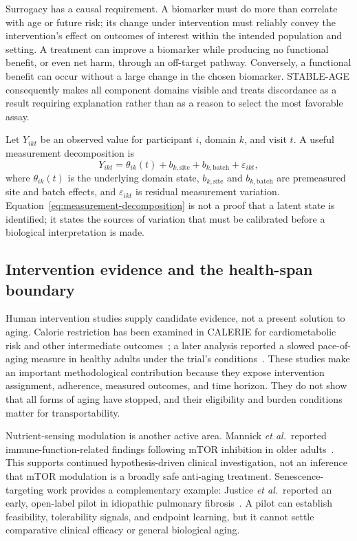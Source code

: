 \documentclass[10pt,conference]{IEEEtran}
\begin{document}
Surrogacy has a causal requirement. A biomarker must do more than correlate with age or future risk; its change under intervention must reliably convey the intervention's effect on outcomes of interest within the intended population and setting. A treatment can improve a biomarker while producing no functional benefit, or even net harm, through an off-target pathway. Conversely, a functional benefit can occur without a large change in the chosen biomarker. STABLE-AGE consequently makes all component domains visible and treats discordance as a result requiring explanation rather than as a reason to select the most favorable assay.

Let $Y_{ikt}$ be an observed value for participant $i$, domain $k$, and visit $t$. A useful measurement decomposition is
\begin{equation}
Y_{ikt}=\theta_{ik}(t)+b_{k,\mathrm{site}}+b_{k,\mathrm{batch}}+\varepsilon_{ikt},
\label{eq:measurement-decomposition}
\end{equation}
where $\theta_{ik}(t)$ is the underlying domain state, $b_{k,\mathrm{site}}$ and $b_{k,\mathrm{batch}}$ are premeasured site and batch effects, and $\varepsilon_{ikt}$ is residual measurement variation. Equation~\eqref{eq:measurement-decomposition} is not a proof that a latent state is identified; it states the sources of variation that must be calibrated before a biological interpretation is made.

\subsection{Intervention evidence and the health-span boundary}

Human intervention studies supply candidate evidence, not a present solution to aging. Calorie restriction has been examined in CALERIE for cardiometabolic risk and other intermediate outcomes~\cite{kraus2019}; a later analysis reported a slowed pace-of-aging measure in healthy adults under the trial's conditions~\cite{belsky2023}. These studies make an important methodological contribution because they expose intervention assignment, adherence, measured outcomes, and time horizon. They do not show that all forms of aging have stopped, and their eligibility and burden conditions matter for transportability.

Nutrient-sensing modulation is another active area. Mannick \emph{et al.}\ reported immune-function-related findings following mTOR inhibition in older adults~\cite{mannick2014}. This supports continued hypothesis-driven clinical investigation, not an inference that mTOR modulation is a broadly safe anti-aging treatment. Senescence-targeting work provides a complementary example: Justice \emph{et al.}\ reported an early, open-label pilot in idiopathic pulmonary fibrosis~\cite{justice2019}. A pilot can establish feasibility, tolerability signals, and endpoint learning, but it cannot settle comparative clinical efficacy or general biological aging.
\end{document}
